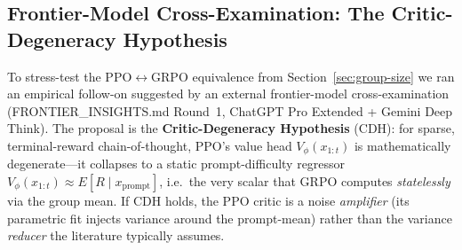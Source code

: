 \documentclass{article}
\begin{document}
\subsection{Frontier-Model Cross-Examination: The Critic-Degeneracy Hypothesis}
\label{sec:frontier-critic-degeneracy}

To stress-test the PPO$\leftrightarrow$GRPO equivalence from
Section~\ref{sec:group-size} we ran an empirical follow-on suggested
by an external frontier-model cross-examination (FRONTIER\_INSIGHTS.md
Round~1, ChatGPT Pro Extended + Gemini Deep Think). The proposal is
the \textbf{Critic-Degeneracy Hypothesis} (CDH): for sparse,
terminal-reward chain-of-thought, PPO's value head
$V_\phi(x_{1:t})$ is mathematically degenerate---it collapses to a
static prompt-difficulty regressor
$V_\phi(x_{1:t}) \approx E[R \mid x_\text{prompt}]$, i.e.\ the very
scalar that GRPO computes \emph{statelessly} via the group mean. If
CDH holds, the PPO critic is a noise \emph{amplifier} (its parametric
fit injects variance around the prompt-mean) rather than the variance
\emph{reducer} the literature typically assumes.
\end{document}

